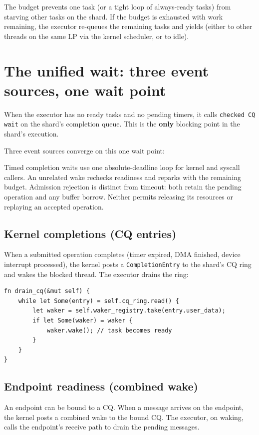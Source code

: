 The budget prevents one task (or a tight loop of always-ready tasks) from
starving other tasks on the shard. If the budget is exhausted with work remaining,
the executor re-queues the remaining tasks and yields (either to other threads on
the same LP via the kernel scheduler, or to idle).

\section{The unified wait: three event sources, one wait point}
\label{sec:sitas-unified-wait}

When the executor has no ready tasks and no pending timers, it calls
\texttt{checked CQ wait} on the shard's completion queue. This is the \textbf{only}
blocking point in the shard's execution.

Three event sources converge on this one wait point:

Timed completion waits use one absolute-deadline loop for kernel and syscall
callers. An unrelated wake rechecks readiness and reparks with the remaining
budget. Admission rejection is distinct from timeout: both retain the pending
operation and any buffer borrow. Neither permits releasing its resources or
replaying an accepted operation.

\subsection{Kernel completions (CQ entries)}

When a submitted operation completes (timer expired, DMA finished, device
interrupt processed), the kernel posts a \texttt{CompletionEntry} to the shard's
CQ ring and wakes the blocked thread. The executor drains the ring:

\begin{lstlisting}[style=rustCode]
fn drain_cq(&mut self) {
    while let Some(entry) = self.cq_ring.read() {
        let waker = self.waker_registry.take(entry.user_data);
        if let Some(waker) = waker {
            waker.wake(); // task becomes ready
        }
    }
}
\end{lstlisting}

\subsection{Endpoint readiness (combined wake)}

An endpoint can be bound to a CQ. When a message arrives on the endpoint, the
kernel posts a combined wake to the bound CQ. The executor, on waking, calls the
endpoint's receive path to drain the pending messages.

